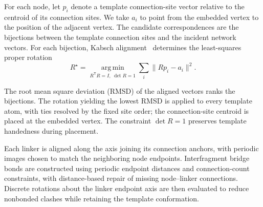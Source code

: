 \documentclass[a5paper, 10pt]{article}
\begin{document}
For each node, let $p_i$ denote a template connection-site vector relative to the centroid of its connection sites. We take $a_i$ to point from the embedded vertex to the position of the adjacent vertex. The candidate correspondences are the bijections between the template connection sites and the incident network vectors. For each bijection, Kabsch alignment~\cite{kabsch1976solution,lawrence2019kabschumeyama} determines the least-squares proper rotation%
\begin{equation}
R^\star=\underset{R^{\mathsf T}R=I,\;\det R=1}{\operatorname{arg\,min}}
\sum_i\lVert R p_i-a_i\rVert^2.
\label{eq:kabsch_alignment}
\end{equation}

The root mean square deviation (RMSD) of the aligned vectors ranks the bijections. The rotation yielding the lowest RMSD is applied to every template atom, with ties resolved by the fixed site order; the connection-site centroid is placed at the embedded vertex. The constraint $\det R=1$ preserves template handedness during placement.%

Each linker is aligned along the axis joining its connection anchors, with periodic images chosen to match the neighboring node endpoints. Interfragment bridge bonds are constructed using periodic endpoint distances and connection-count constraints, with distance-based repair of missing node--linker connections. Discrete rotations about the linker endpoint axis are then evaluated to reduce nonbonded clashes while retaining the template conformation.
\end{document}
